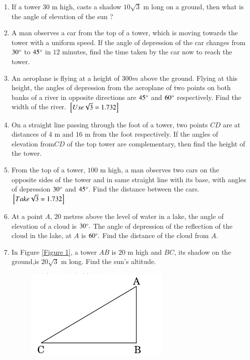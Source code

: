 \begin{enumerate}[label=\thesubsection.\arabic*.,ref=\thesubsection.\theenumi]
\hfill{}
\item If a tower $30$ m high, casts a shadow $10\sqrt{3}$ m long on a ground, then what is the angle of elevation of the sun ?
\hfill{}\item A man observes a car from the top of a tower, which is  moving towards the tower with a uniform speed. If the angle of depression of the car changes from $30\degree$ to $45\degree$ in $12$ minutes, find the time taken by the car now to reach the tower.
\hfill{}\item An aeroplane is flying at a height of $300 m$ above the ground. Flying at this height, the angles of depression from the aeroplane of two points on both banks of a river in opposite directions are $45\degree$ and $60\degree$ respectively. Find the width of the river. 
\hfill ${}\left[Use \sqrt 3 = 1.732\right]$
\hfill{}\item On a straight line passing through the foot of a tower, two points $C$$D$ are at distances of $4$ m
and $16$ m from the foot respectively. If the angles of elevation from$C$$D$ of the top tower are complementary, then find the height of the tower.  
\hfill{}\item From the top of a tower, $100$ m high, a man observes two cars on the opposite sides of the tower and in same straight line with its base, with angles of depression $30\degree$ and $45\degree$. Find the distance between the cars.
\hfill  ${}\left[Take \sqrt{3} = 1.732\right]$
\hfill{}
\item At a point $A$, $20$ metres above the level of water in a lake, the angle of elevation of a cloud is $30 \degree.$ The angle of depression of the reflection of the cloud in the lake, at $A$ is $60\degree .$ Find the distance of the cloud from $A$.
\hfill{}\item In Figure \ref{Figure 1}, a tower $AB$ is $20$ m high and $BC$, its shadow on the ground,is $20\sqrt{3}$ m long. Find the sun's altitude.
\begin{figure}[h!]
	\centering
    \includegraphics[width=\columnwidth]{cbse/figs/cbse_30_3_1.png}

\end{figure}
\end{enumerate}
